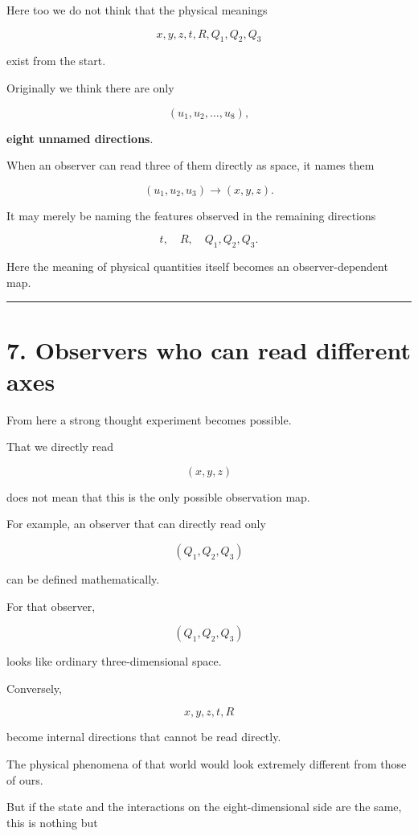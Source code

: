 \documentclass[
  a4paper,
]{article}
\begin{document}
Here too we do not think that the physical meanings

\[
x,y,z,t,R,Q_1,Q_2,Q_3
\]

exist from the start.

Originally we think there are only

\[
(u_1,u_2,\ldots,u_8),
\]

\textbf{eight unnamed directions}.

When an observer can read three of them directly as space, it names them

\[
(u_1,u_2,u_3)\rightarrow(x,y,z).
\]

It may merely be naming the features observed in the remaining
directions

\[
t,\quad R,\quad Q_1,Q_2,Q_3 .
\]

Here the meaning of physical quantities itself becomes an
observer-dependent map.

\begin{center}\rule{0.5\linewidth}{0.5pt}\end{center}

\section{7. Observers who can read different
axes}\label{observers-who-can-read-different-axes}

From here a strong thought experiment becomes possible.

That we directly read

\[
(x,y,z)
\]

does not mean that this is the only possible observation map.

For example, an observer that can directly read only

\[
(Q_1,Q_2,Q_3)
\]

can be defined mathematically.

For that observer,

\[
(Q_1,Q_2,Q_3)
\]

looks like ordinary three-dimensional space.

Conversely,

\[
x,y,z,t,R
\]

become internal directions that cannot be read directly.

The physical phenomena of that world would look extremely different from
those of ours.

But if the state and the interactions on the eight-dimensional side are
the same, this is nothing but
\end{document}
